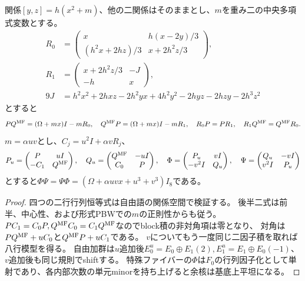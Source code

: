 \begin{proposition}[混合欠損と八行模型]\label{mix:defect}
関係$[y,z]=h(x^2+m)$、他の二関係はそのままとし、$m$を重み二の中央多項式変数とする。
\begin{align*}
 R_0&=\begin{pmatrix}x&h(x-2y)/3\\(h^2x+2hz)/3&x+2h^2z/3\end{pmatrix},\\
 R_1&=\begin{pmatrix}x+2h^2z/3&-J\\-h&x\end{pmatrix},\\
 9J&=h^2x^2+2hxz-2h^2yx+4h^2y^2-2hyz-2hzy-2h^3z^2
\end{align*}
とすると
\[
 PQ^{\rm MF}=(\Omega+mx)I-mR_0,\quad Q^{\rm MF}P=(\Omega+mx)I-mR_1,
 \quad R_0P=PR_1,\quad R_1Q^{\rm MF}=Q^{\rm MF}R_0.
\]
$m=\alpha uv$とし、$C_j=u^2I+\alpha vR_j$、
\[
 P_u=\begin{pmatrix}P&uI\\-C_1&Q^{\rm MF}\end{pmatrix},\quad
 Q_u=\begin{pmatrix}Q^{\rm MF}&-uI\\C_0&P\end{pmatrix},\quad
 \Phi=\begin{pmatrix}P_u&vI\\-v^2I&Q_u\end{pmatrix},\quad
 \Psi=\begin{pmatrix}Q_u&-vI\\v^2I&P_u\end{pmatrix}
\]
とすると$\Phi\Psi=\Psi\Phi=(\Omega+\alpha uvx+u^3+v^3)I_8$である。
\end{proposition}
\begin{proof}
四つの二行行列恒等式は自由語の関係空間で検証する。
後半二式は前半、中心性、および形式PBWでの$m$の正則性からも従う。
$PC_1=C_0P,Q^{\rm MF}C_0=C_1Q^{\rm MF}$なのでblock積の非対角項は零となり、
対角は$PQ^{\rm MF}+uC_0$と$Q^{\rm MF}P+uC_1$である。
$v$についてもう一度同じ二因子積を取れば八行模型を得る。
自由加群は$u$追加後$E_0^u=E_0\oplus E_1(2),E_1^u=E_1\oplus E_0(-1)$、
$v$追加後も同じ規則でshiftする。
特殊ファイバーの$\Phi$は$F_0$の行列因子化として単射であり、各内部次数の単元minorを持ち上げると余核は基底上平坦になる。
\end{proof}

